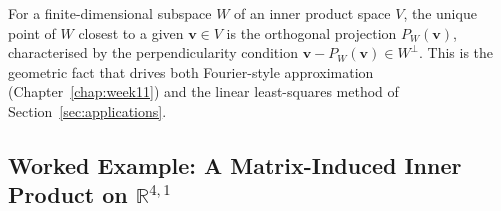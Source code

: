 \documentclass[11pt, a4paper, notitlepage]{report}
\theoremstyle{definition}
\theoremstyle{remark}
\begin{document}
\begin{keyresult}[title={Key Result: Closest Point in a Subspace}]
For a finite-dimensional subspace $W$ of an inner product space $V$,
the unique point of $W$ closest to a given $\mathbf{v}\in V$ is the
orthogonal projection $P_W(\mathbf{v})$, characterised by the perpendicularity
condition $\mathbf{v} - P_W(\mathbf{v})\in W^\perp$. This is the geometric
fact that drives both Fourier-style approximation (Chapter~\ref{chap:week11})
and the linear least-squares method of Section~\ref{sec:applications}.
\end{keyresult}

\subsection{Worked Example: A Matrix-Induced Inner Product on $\mathbb{R}^{4,1}$}
\label{subsec:orth-comp-R41}
\end{document}
